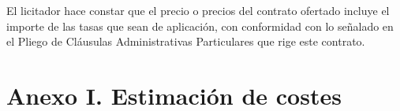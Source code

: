 \documentclass{article}
\begin{document}
\begin{figure}[H]
\end{figure}

El licitador hace constar que el precio o precios del contrato ofertado incluye el importe de las tasas que sean de aplicación, con conformidad con lo señalado en el Pliego de Cláusulas Administrativas Particulares que rige este contrato. 
\newpage
\section*{Anexo I. Estimación de costes}
\begin{figure}[H]
	\hspace*{-3.5cm}
\end{figure}
\end{document}

